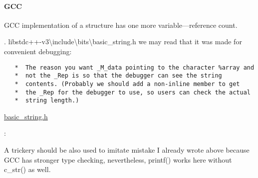 \paragraph{GCC}

{GCC implementation of a structure has one more variable---reference count}.

.
 libstdc++-v3\textbackslash{}include\textbackslash{}bits\textbackslash{}basic\_string.h 
{we may read that it was made for convenient debugging}:

\begin{lstlisting}
   *  The reason you want _M_data pointing to the character %array and
   *  not the _Rep is so that the debugger can see the string
   *  contents. (Probably we should add a non-inline member to get
   *  the _Rep for the debugger to use, so users can check the actual
   *  string length.)
\end{lstlisting}

\href{http://gcc.gnu.org/onlinedocs/libstdc++/libstdc++-html-USERS-4.4/a01068.html}
{basic\_string.h}

:



{A trickery should be also used to imitate mistake I already wrote above because GCC
has stronger type checking, nevertheless, printf() works here without c\_str() as well}.

\subsubsection{}





